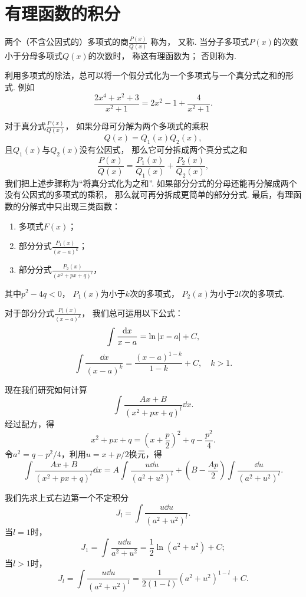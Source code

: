 \section{有理函数的积分}
两个（不含公因式的）多项式的商\(\frac{P(x)}{Q(x)}\)
称为，
又称.
当分子多项式\(P(x)\)的次数小于分母多项式\(Q(x)\)的次数时，
称这有理函数为；
否则称为.

利用多项式的除法，总可以将一个假分式化为一个多项式与一个真分式之和的形式.
例如\[
	\frac{2x^4+x^2+3}{x^2+1}
	= 2x^2-1+\frac{4}{x^2+1}.
\]

对于真分式\(\frac{P(x)}{Q(x)}\)，
如果分母可分解为两个多项式的乘积\[
	Q(x)=Q_1(x)Q_2(x),
\]
且\(Q_1(x)\)与\(Q_2(x)\)没有公因式，
那么它可分拆成两个真分式之和\[
	\frac{P(x)}{Q(x)} = \frac{P_1(x)}{Q_1(x)} + \frac{P_2(x)}{Q_2(x)},
\]
我们把上述步骤称为“将真分式化为之和”.
如果部分分式的分母还能再分解成两个没有公因式的多项式的乘积，
那么就可再分拆成更简单的部分分式.
最后，有理函数的分解式中只出现三类函数：
\begin{enumerate}
	\item 多项式\(F(x)\)；
	\item 部分分式\(\frac{P_1(x)}{(x-a)^k}\)；
	\item 部分分式\(\frac{P_2(x)}{(x^2+px+q)^l}\)，
\end{enumerate}
其中\(p^2-4q<0\)，
\(P_1(x)\)为小于\(k\)次的多项式，
\(P_2(x)\)为小于\(2l\)次的多项式.

对于部分分式\(\frac{P_1(x)}{(x-a)^k}\)，
我们总可运用以下公式：\[
	\int \frac{\dd{x}}{x-a} = \ln\abs{x-a} + C,
\]\[
	\int \frac{\dd{x}}{(x-a)^k} = \frac{(x-a)^{1-k}}{1-k} + C,
	\quad k>1.
\]

现在我们研究如何计算\[
	\int \frac{Ax+B}{(x^2+px+q)^l} \dd{x}.
\]
经过配方，得\[
	x^2+px+q = \left(x+\frac{p}{2}\right)^2 + q-\frac{p^2}{4}.
\]
令\(a^2=q-p^2/4\)，利用\(u=x+p/2\)换元，得\[
	\int \frac{Ax+B}{(x^2+px+q)^l} \dd{x}
	= A \int \frac{u \dd{u}}{(a^2+u^2)^l}
	+ \left(B - \frac{Ap}{2}\right) \int \frac{\dd{u}}{(a^2+u^2)^l}.
\]

我们先求上式右边第一个不定积分\[
	J_l = \int \frac{u \dd{u}}{(a^2+u^2)^l}.
\]
当\(l=1\)时，\[
	J_1
	= \int \frac{u \dd{u}}{a^2+u^2}
	= \frac{1}{2} \ln(a^2+u^2) + C;
\]
当\(l>1\)时，\[
	J_l
	= \int \frac{u \dd{u}}{(a^2+u^2)^l}
	= \frac{1}{2(1-l)} (a^2+u^2)^{1-l} + C.
\]

